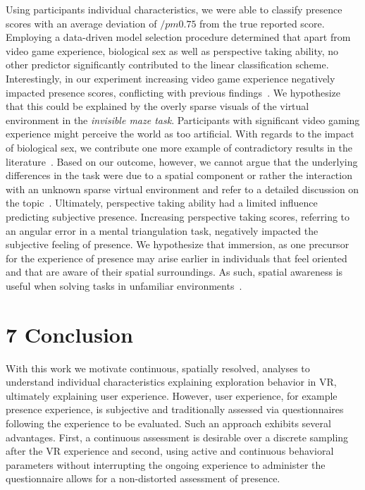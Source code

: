 Using participants individual characteristics, we were able to classify presence scores with an average deviation of $/pm 0.75$ from the true reported score. Employing a data-driven model selection procedure determined that apart from video game experience, biological sex as well as perspective taking ability, no other predictor significantly contributed to the linear classification scheme. Interestingly, in our experiment increasing video game experience negatively impacted presence scores, conflicting with previous findings~\cite{Lachlan}. We hypothesize that this could be explained by the overly sparse visuals of the virtual environment in the \textit{invisible maze task}. Participants with significant video gaming experience might perceive the world as too artificial. With regards to the impact of biological sex, we contribute one more example of contradictory results in the literature~\cite{Coluccia2004}. Based on our outcome, however, we cannot argue that the underlying differences in the task were due to a spatial component or rather the interaction with an unknown sparse virtual environment and refer to a detailed discussion on the topic~\cite{Felnhofer}. Ultimately, perspective taking ability had a limited influence predicting subjective presence. Increasing perspective taking scores, referring to an angular error in a mental triangulation task, negatively impacted the subjective feeling of presence. We hypothesize that immersion, as one precursor for the experience of presence may arise earlier in individuals that feel oriented and that are aware of their spatial surroundings. As such, spatial awareness is useful when solving tasks in unfamiliar environments~\cite{Slater2018}.

\section{7 Conclusion}
With this work we motivate continuous, spatially resolved, analyses to understand individual characteristics explaining exploration behavior in VR, ultimately explaining user experience. However, user experience, for example presence experience, is subjective and traditionally assessed via questionnaires following the experience to be evaluated. Such an approach exhibits several advantages. First, a continuous assessment is desirable over a discrete sampling after the VR experience and second, using active and continuous behavioral parameters without interrupting the ongoing experience to administer the questionnaire allows for a non-distorted assessment of presence.

